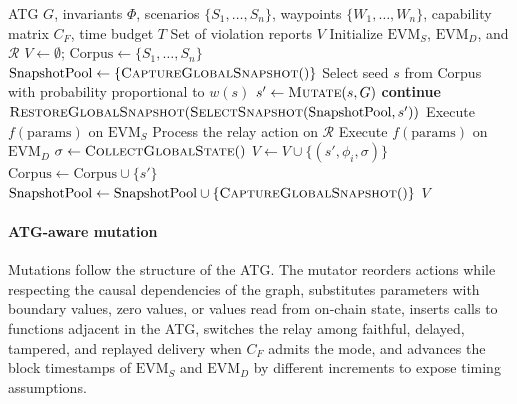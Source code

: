 \documentclass[a4paper]{cas-sc}
\begin{document}
\begin{algorithm}[!t]
\caption{Dual-chain fuzzing loop of the full BridgeSentry design; Section~\ref{sec:evaluated} describes the loop and the oracle used in the evaluation}
\label{alg:fuzzing}
\begin{algorithmic}[1]
\REQUIRE ATG $G$, invariants $\Phi$, scenarios $\{S_1, \ldots, S_n\}$, waypoints $\{W_1, \ldots, W_n\}$, capability matrix $C_F$, time budget $T$
\ENSURE Set of violation reports $V$
\STATE Initialize $\text{EVM}_S$, $\text{EVM}_D$, and $\mathcal{R}$
\STATE $V \gets \emptyset$; $\text{Corpus} \gets \{S_1, \ldots, S_n\}$
\STATE $\text{SnapshotPool} \gets \{\textsc{CaptureGlobalSnapshot}()\}$
    \STATE Select seed $s$ from Corpus with probability proportional to $w(s)$
    \STATE $s' \gets \textsc{Mutate}(s, G)$ 
        \STATE \textbf{continue} 
    \ENDIF
    \STATE $\textsc{RestoreGlobalSnapshot}(\textsc{SelectSnapshot}(\text{SnapshotPool}, s'))$
            \STATE Execute $f(\text{params})$ on $\text{EVM}_S$
            \STATE Process the relay action on $\mathcal{R}$
        \ELSE
            \STATE Execute $f(\text{params})$ on $\text{EVM}_D$
        \ENDIF
    \ENDFOR
    \STATE $\sigma \gets \textsc{CollectGlobalState}()$
        \STATE $V \gets V \cup \{(s', \phi_i, \sigma)\}$
    \ENDFOR
        \STATE $\text{Corpus} \gets \text{Corpus} \cup \{s'\}$
        \STATE $\text{SnapshotPool} \gets \text{SnapshotPool} \cup \{\textsc{CaptureGlobalSnapshot}()\}$
    \ENDIF
\ENDWHILE
\RETURN $V$
\end{algorithmic}
\end{algorithm}

\paragraph{ATG-aware mutation}
Mutations follow the structure of the ATG. The mutator reorders actions while respecting the causal dependencies of the graph, substitutes parameters with boundary values, zero values, or values read from on-chain state, inserts calls to functions adjacent in the ATG, switches the relay among faithful, delayed, tampered, and replayed delivery when $C_F$ admits the mode, and advances the block timestamps of $\text{EVM}_S$ and $\text{EVM}_D$ by different increments to expose timing assumptions.
\end{document}
